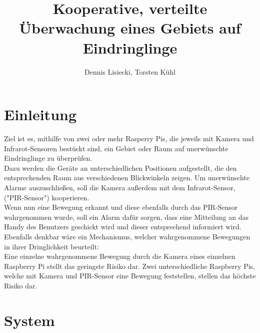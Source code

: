 \documentclass[journal]{IEEEtran}
\title{Kooperative, verteilte Überwachung eines Gebiets auf Eindringlinge}		%
\author{Dennis Lisiecki, Torsten Kühl}								%
\begin{document}

\maketitle	%




\section{Einleitung} 
Ziel ist es, mithilfe von zwei oder mehr Rasperry Pis, die jeweils mit Kamera und Infrarot-Sensoren bestückt sind, ein Gebiet oder Raum auf unerwünschte Eindringlinge zu überprüfen.\\
Dazu werden die Geräte an unterschiedlichen Positionen aufgestellt, die den entsprechenden Raum aus verschiedenen Blickwinkeln zeigen. 
Um unerwünschte Alarme auszuschließen, soll die Kamera außerdem mit dem Infrarot-Sensor, ("PIR-Sensor") kooperieren. \\
Wenn nun eine Bewegung erkannt und diese ebenfalls durch das PIR-Sensor wahrgenommen wurde, soll ein Alarm dafür sorgen, dass eine Mitteilung an das Handy des Benutzers geschickt wird und dieser entsprechend informiert wird.\\
Ebenfalls denkbar wäre ein Mechanismus, welcher wahrgenommene Bewegungen in ihrer Dringlichkeit beurteilt:\\
Eine einzelne wahrgenommene Bewegung durch die Kamera eines einzelnen Raspberry Pi stellt das geringste Risiko dar.
Zwei unterschiedliche Raspberry Pis, welche mit Kamera und PIR-Sensor eine Bewegung feststellen, stellen das höchste Risiko dar.




\section{System}
\end{document}
